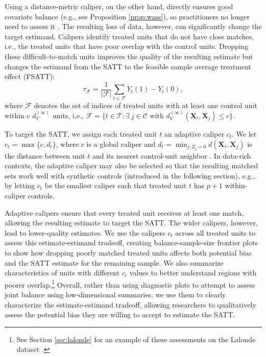 \documentclass{article}
\newcommand{\bX}{\mathbf{X}}
\newcommand{\Xt}{\mathbf{X}_t}
\newcommand{\Xj}{\mathbf{X}_j}
\begin{document}

Using a distance-metric caliper, on the other hand, directly ensures good covariate balance (e.g., see Proposition \ref{prop:wass}), so practitioners no longer need to assess it \citep{iacus2012causal}.
The resulting loss of data, however, can significantly change the target estimand.
Calipers identify treated units that do not have close matches, i.e., the treated units that have poor overlap with the control units.
Dropping these difficult-to-match units improves the quality of the resulting estimate but changes the estimand from the SATT to the feasible sample average treatment effect (FSATT):
$$\tau_\mathcal{F} = \frac{1}{|\mathcal{F}|} \sum_{t \in \mathcal{F}} Y_t(1) - Y_t(0),$$
where $\mathcal{F}$ denotes the set of indices of treated units with at least one control unit within $c$ $d_V^{(\infty)}$ units, i.e., $\mathcal{F} = \{t \in \mathcal{T}: \exists \ j \in \mathcal{C} \text{ with } d_V^{(\infty)}(\Xt, \Xj) \leq c\}$.

To target the SATT, we assign each treated unit $t$ an adaptive caliper $c_t$.
We let $c_t = \max \{c, d_t\}$, where $c$ is a global caliper and $d_t = \min_{j:Z_j=0} d(\bX_t, \bX_j)$ is the distance between unit $t$ and its nearest control-unit neighbor \citep{dehejia2002propensity}.
In data-rich contexts, the adaptive caliper may also be selected so that the resulting matched sets work well with synthetic controls (introduced in the following section), e.g., by letting $c_t$ be the smallest caliper such that treated unit $t$ has $p+1$ within-caliper controls.

Adaptive calipers ensure that every treated unit receives at least one match, allowing the resulting estimate to target the SATT.
The wider calipers, however, lead to lower-quality estimates.
We use the calipers $c_t$ across all treated units to assess this estimate-estimand tradeoff,
creating balance-sample-size frontier plots \citep{king2017balance} to show how dropping poorly matched treated units affects both potential bias and the SATT estimate for the remaining sample.
We also summarize characteristics of units with different $c_t$ values to better understand regions with poorer overlap.\footnote{See Section \ref{sec:lalonde} for an example of these assessments on the Lalonde dataset \citep{lalonde1986evaluating}.}
Overall, rather than using diagnostic plots to attempt to assess joint balance using low-dimensional summaries, we use them to clearly characterize the estimate-estimand tradeoff, allowing researchers to qualitatively assess the potential bias they are willing to accept to estimate the SATT.
\end{document}
